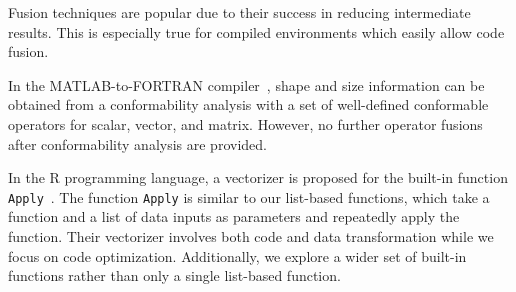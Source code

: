 


Fusion techniques are popular due to their success in reducing intermediate
results. This is especially true for compiled environments which easily
allow code fusion.



In the MATLAB-to-FORTRAN compiler~\cite{rose1999:techniques}, shape and size
information can be obtained from a conformability analysis with a set of
well-defined conformable operators for scalar, vector, and matrix.
However, no further operator fusions after conformability analysis are provided.

In the R programming language, a vectorizer is proposed for the built-in
function \texttt{Apply}~\cite{Wang2015:vectorization}. The function
\texttt{Apply} is similar to our list-based functions, which take
a function and a list of data inputs as parameters and repeatedly apply
the function. Their vectorizer involves both code and data transformation
while we focus on code optimization. Additionally, we explore a wider set
of built-in functions rather than only a single list-based function.

